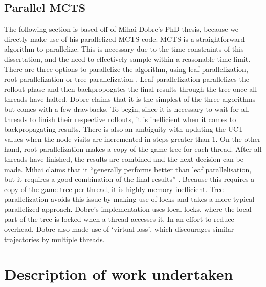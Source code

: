 \documentclass[msc, deptreport, ai, romanprepages]{infthesis}
\begin{document}
\section{Parallel MCTS}
The following section is based off of Mihai Dobre’s PhD thesis, because we directly make use of his parallelized MCTS code. MCTS is a straightforward algorithm to parallelize. This is necessary due to the time constraints of this dissertation, and the need to effectively sample within a reasonable time limit. There are three options to parallelize the algorithm, using leaf parallelization, root parallelization or tree parallelization \cite{Mihai}. Leaf parallelization parallelizes the rollout phase and then backpropogates the final results through the tree once all threads have halted. Dobre claims that it is the simplest of the three algorithms but comes with a few drawbacks. To begin, since it is necessary to wait for all threads to finish their respective rollouts, it is inefficient when it comes to backpropagating results. There is also an ambiguity with updating the UCT values when the node visits are incremented in steps greater than 1. On the other hand, root parallelization makes a copy of the game tree for each thread. After all threads have finished, the results are combined and the next decision can be made. Mihai claims that it ``generally performs better than leaf parallelisation, but it requires a good combination of the final results'' \cite{Mihai}. Because this requires a copy of the game tree per thread, it is highly memory inefficient. Tree parallelization avoids this issue by making use of locks and takes a more typical parallelized approach. Dobre’s implementation uses local locks, where the local part of the tree is locked when a thread accesses it. In an effort to reduce overhead, Dobre also made use of `virtual loss', which discourages similar trajectories by multiple threads.

\chapter{Description of work undertaken}
\end{document}
